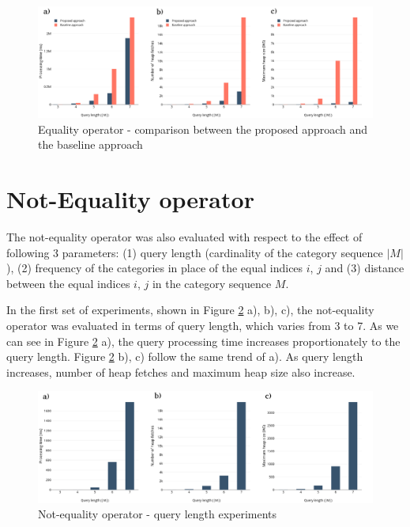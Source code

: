 \begin{figure}[H]
	\includegraphics[scale=0.3]{images/eo2_length.png}
	\centering
	\caption{Equality operator - comparison between the proposed approach and the baseline approach}
	\label{fig:eo2_length}
\end{figure}


\section{Not-Equality operator}
\label{sec:experimentsNEO}

The not-equality operator was also evaluated with respect to the effect of following 3 parameters: (1) query length (cardinality of the category sequence $|M|$), (2) frequency of the categories in place of the equal indices $i$, $j$ and (3) distance between the equal indices $i$, $j$ in the category sequence $M$.

In the first set of experiments, shown in Figure \ref{fig:neo_length} a), b), c), the not-equality operator was evaluated in terms of query length, which varies from 3 to 7. As we can see in Figure \ref{fig:neo_length} a), the query processing time increases proportionately to the query length. Figure \ref{fig:neo_length} b), c) follow the same trend of a). As query length increases, number of heap fetches and maximum heap size also increase.

\begin{figure}[H]
	\includegraphics[scale=0.3]{images/neo_length.png}
	\centering
	\caption{Not-equality operator - query length experiments}
	\label{fig:neo_length}
\end{figure}

